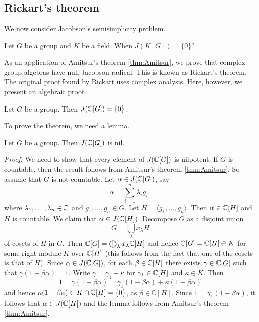 \section{}

\subsection{Rickart's theorem}

We now consider Jacobson's semisimplicity problem. 

\begin{question}
\label{Jacobson's semisimplicity problem}
Let $G$ be a group and $K$ be a field. When $J(K[G])=\{0\}$?
\end{question}

As an application of Amitsur's theorem \ref{thm:Amitsur}, 
we prove that 
complex group algebras have null Jacobson radical.
This is known as 
Rickart's theorem. The original proof found by Rickart 
uses complex analysis. Here, however, 
we present an algebraic proof. 

\begin{theorem}[Rickart]
\label{thm:Rickart}
    Let $G$ be a group. Then $J(\mathbb{C}[G])=\{0\}$.
\end{theorem}

To prove the theorem, we need a lemma.

\begin{lemma}
Let $G$ be a group. Then $J(\mathbb{C}[G])$ is nil.        
\end{lemma}

\begin{proof}
    We need to show that every element of $J(\mathbb{C}[G])$ is nilpotent. 
    If $G$ is countable, then the result follows from Amitsur's theorem \ref{thm:Amitsur}. So assume that 
    $G$ is not countable. Let $\alpha\in J(\mathbb{C}[G])$, say
    \[
    \alpha=\sum_{i=1}^n\lambda_ig_i,
    \]
    where $\lambda_1,\dots,\lambda_n\in\mathbb{C}$ and $g_1,\dots,g_n\in G$. Let $H=\langle g_1,\dots,g_n\rangle$.
    Then $\alpha\in \mathbb{C}[H]$ and $H$ is countable. We claim that $\alpha\in J(\mathbb{C}[H])$. Decompose
    $G$ as a disjoint union 
    \[
    G=\bigcup_\lambda x_\lambda H
    \]
    of cosets of $H$ in $G$. Then $\mathbb{C}[G]=\bigoplus_\lambda x_\lambda\mathbb{C}[H]$ and
    hence $\mathbb{C}[G]=\mathbb{C}[H]\oplus K$ for some right module $K$ over $\mathbb{C}[H]$ (this follows
    from the fact that one of the cosets is that of $H$). Since $\alpha\in J(\mathbb{C}[G])$, for each 
    $\beta\in\mathbb{C}[H]$ there exists $\gamma\in\mathbb{C}[G]$ such that 
    $\gamma(1-\beta\alpha)=1$. Write $\gamma=\gamma_1+\kappa$ for $\gamma_1\in\mathbb{C}[H]$ and $\kappa\in K$. Then
    \[
    1=\gamma(1-\beta\alpha)=\gamma_1(1-\beta\alpha)+\kappa(1-\beta\alpha)
    \]
    and hence $\kappa(1-\beta\alpha)\in K\cap \mathbb{C}[H]=\{0\}$, as $\beta\in\mathbb{C}[H]$. 
    Since $1=\gamma_1(1-\beta\alpha)$, it follows that
    $\alpha\in J(\mathbb{C}[H])$ and the lemma follows from Amitsur's theorem \ref{thm:Amitsur}.  
\end{proof}

